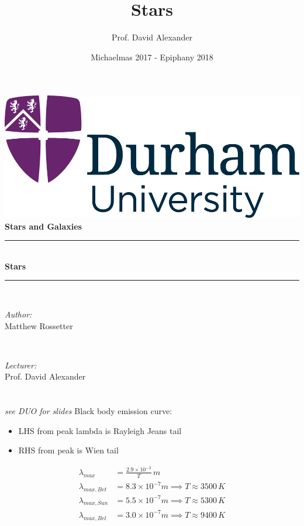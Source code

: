 \documentclass[a4paper,11pt,normalem]{article}
\title{Stars}
\author{Prof. David Alexander}
\date{Michaelmas 2017 - Epiphany 2018}
\newcommand{\HRule}{\rule{\linewidth}{0.5mm}}
\begin{document}
{\centering
{\includegraphics[scale=0.5]{../../logo0.png}\hfill{\Large\bfseries{}}}\\[1.5cm]
{\LARGE\bfseries Stars and Galaxies}\\[0.5cm]
\HRule \\[0.3cm]
{\huge\bfseries Stars}\\[0.1cm]
\HRule \\[1cm]}
\begin{center}
\begin{minipage}{0.4\textwidth}
    \begin{flushleft} \large
        \emph{Author:} \\ Matthew Rossetter
    \end{flushleft}
\end{minipage}~
\begin{minipage}{0.4\textwidth}
    \begin{flushright} \large
        \emph{Lecturer:} \\ Prof. David Alexander
    \end{flushright}
\end{minipage}
\end{center}

\section{}
\emph{see DUO for slides}
Black body emission curve:
    \begin{itemize}
        \item LHS from peak lambda is Rayleigh Jeans tail
        \item RHS from peak is Wien tail
    \end{itemize}

\begin{align}
    \lambda_{max} &= \frac{2.9 \times 10^{-3}}{T} \, m \\
    \lambda_{max.\,Bet} &= 8.3 \times 10^{-7}m \implies T \approx 3500\,K \\
    \lambda_{max,Sun} &= 5.5 \times 10^{-7}m \implies T \approx 5300\,K \\
    \lambda_{max, Bel} &= 3.0 \times 10^{-7} m \implies T \approx 9400\,K\\
\end{align}
\end{document}
